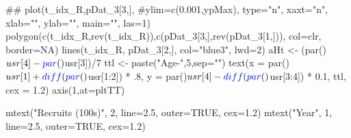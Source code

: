 \documentclass[11pt,]{article}
\newenvironment{Shaded}{}{}
\newcommand{\KeywordTok}[1]{\textcolor[rgb]{0.00,0.00,1.00}{#1}}
\newcommand{\DataTypeTok}[1]{#1}
\newcommand{\DecValTok}[1]{#1}
\newcommand{\FloatTok}[1]{#1}
\newcommand{\StringTok}[1]{\textcolor[rgb]{0.00,0.50,0.50}{#1}}
\newcommand{\CommentTok}[1]{\textcolor[rgb]{0.00,0.50,0.00}{#1}}
\newcommand{\OtherTok}[1]{\textcolor[rgb]{1.00,0.25,0.00}{#1}}
\newcommand{\OperatorTok}[1]{#1}
\newcommand{\NormalTok}[1]{#1}
\begin{document}
\begin{Shaded}
\begin{Highlighting}[]
\NormalTok{        ##}
        \KeywordTok{plot}\NormalTok{(t_idx_R,pDat_}\DecValTok{3}\NormalTok{[}\DecValTok{3}\NormalTok{,], }\CommentTok{#ylim=c(0.001,ypMax),}
         \DataTypeTok{type=}\StringTok{"n"}\NormalTok{, }\DataTypeTok{xaxt=}\StringTok{"n"}\NormalTok{, }\DataTypeTok{xlab=}\StringTok{""}\NormalTok{, }\DataTypeTok{ylab=}\StringTok{""}\NormalTok{, }\DataTypeTok{main=}\StringTok{""}\NormalTok{, }\DataTypeTok{las=}\DecValTok{1}\NormalTok{)}
    \KeywordTok{polygon}\NormalTok{(}\KeywordTok{c}\NormalTok{(t_idx_R,}\KeywordTok{rev}\NormalTok{(t_idx_R)),}\KeywordTok{c}\NormalTok{(pDat_}\DecValTok{3}\NormalTok{[}\DecValTok{3}\NormalTok{,],}\KeywordTok{rev}\NormalTok{(pDat_}\DecValTok{3}\NormalTok{[}\DecValTok{1}\NormalTok{,])), }\DataTypeTok{col=}\NormalTok{clr, }\DataTypeTok{border=}\OtherTok{NA}\NormalTok{)}
    \KeywordTok{lines}\NormalTok{(t_idx_R, pDat_}\DecValTok{3}\NormalTok{[}\DecValTok{2}\NormalTok{,], }\DataTypeTok{col=}\StringTok{"blue3"}\NormalTok{, }\DataTypeTok{lwd=}\DecValTok{2}\NormalTok{)}
\NormalTok{    aHt <-}\StringTok{ }\NormalTok{(}\KeywordTok{par}\NormalTok{()}\OperatorTok{$}\NormalTok{usr[}\DecValTok{4}\NormalTok{]}\OperatorTok{-}\KeywordTok{par}\NormalTok{()}\OperatorTok{$}\NormalTok{usr[}\DecValTok{3}\NormalTok{])}\OperatorTok{/}\DecValTok{7}
\NormalTok{    ttl <-}\StringTok{ }\KeywordTok{paste}\NormalTok{(}\StringTok{"Age-"}\NormalTok{,}\DecValTok{5}\NormalTok{,}\DataTypeTok{sep=}\StringTok{""}\NormalTok{)}
    \KeywordTok{text}\NormalTok{(}\DataTypeTok{x =} \KeywordTok{par}\NormalTok{()}\OperatorTok{$}\NormalTok{usr[}\DecValTok{1}\NormalTok{] }\OperatorTok{+}\StringTok{ }\KeywordTok{diff}\NormalTok{(}\KeywordTok{par}\NormalTok{()}\OperatorTok{$}\NormalTok{usr[}\DecValTok{1}\OperatorTok{:}\DecValTok{2}\NormalTok{]) }\OperatorTok{*}\StringTok{ }\NormalTok{.}\DecValTok{8}\NormalTok{,}
       \DataTypeTok{y =} \KeywordTok{par}\NormalTok{()}\OperatorTok{$}\NormalTok{usr[}\DecValTok{4}\NormalTok{] }\OperatorTok{-}\StringTok{ }\KeywordTok{diff}\NormalTok{(}\KeywordTok{par}\NormalTok{()}\OperatorTok{$}\NormalTok{usr[}\DecValTok{3}\OperatorTok{:}\DecValTok{4}\NormalTok{]) }\OperatorTok{*}\StringTok{ }\FloatTok{0.1}\NormalTok{,}
\NormalTok{       ttl,}
       \DataTypeTok{cex =} \FloatTok{1.2}\NormalTok{)}
    \KeywordTok{axis}\NormalTok{(}\DecValTok{1}\NormalTok{,}\DataTypeTok{at=}\NormalTok{pltTT)}

\KeywordTok{mtext}\NormalTok{(}\StringTok{"Recruits (100s)"}\NormalTok{, }\DecValTok{2}\NormalTok{, }\DataTypeTok{line=}\FloatTok{2.5}\NormalTok{, }\DataTypeTok{outer=}\OtherTok{TRUE}\NormalTok{, }\DataTypeTok{cex=}\FloatTok{1.2}\NormalTok{)}
\KeywordTok{mtext}\NormalTok{(}\StringTok{"Year"}\NormalTok{, }\DecValTok{1}\NormalTok{, }\DataTypeTok{line=}\FloatTok{2.5}\NormalTok{, }\DataTypeTok{outer=}\OtherTok{TRUE}\NormalTok{, }\DataTypeTok{cex=}\FloatTok{1.2}\NormalTok{)}
\end{Highlighting}
\end{Shaded}
\end{document}
